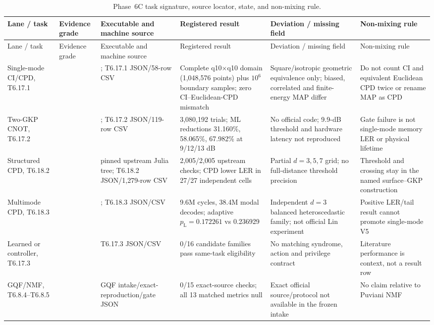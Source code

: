 \documentclass[11pt]{article}
\newcommand{\pL}{p_{\mathrm L}}
\begin{document}
{\scriptsize
\begin{longtable}{@{}L{0.13\textwidth} L{0.15\textwidth} L{0.17\textwidth} L{0.18\textwidth} L{0.16\textwidth} L{0.12\textwidth}@{}}
\caption{Phase~6C task signature, source locator, state, and non-mixing rule.}
\label{tab:supp-phase6c-locator}\\
\toprule
Lane / task & Evidence grade & Executable and machine source & Registered result & Deviation / missing field & Non-mixing rule \\
\midrule
\endfirsthead
\toprule
Lane / task & Evidence grade & Executable and machine source & Registered result & Deviation / missing field & Non-mixing rule \\
\midrule
\endhead
Single-mode CI/CPD, T6.17.1 &  & ; T6.17.1 JSON/58-row CSV & Complete q10$\times$q10 domain (1,048,576 points) plus $10^6$ boundary samples; zero CI--Euclidean-CPD mismatch & Square/isotropic geometric equivalence only; biased, correlated and finite-energy MAP differ & Do not count CI and equivalent Euclidean CPD twice or rename MAP as CPD \\
Two-GKP CNOT, T6.17.2 &  & ; T6.17.2 JSON/119-row CSV & 3,080,192 trials; ML reductions 31.160\%, 58.065\%, 67.982\% at 9/12/13 dB & No official code; 9.9-dB threshold and hardware latency not reproduced & Gate failure is not single-mode memory LER or physical lifetime \\
Structured CPD, T6.18.2 &  & pinned upstream Julia tree; T6.18.2 JSON/1,279-row CSV & 2,005/2,005 upstream checks; CPD lower LER in 27/27 independent cells & Partial $d=3,5,7$ grid; no full-distance threshold precision & Threshold and crossing stay in the named surface--GKP construction \\
Multimode CPD, T6.18.3 &  & ; T6.18.3 JSON/CSV & 9.6M cycles, 38.4M modal decodes; adaptive $\pL=0.172261$ vs 0.236929 & Independent $d=3$ balanced heteroscedastic family; not official Lin experiment & Positive LER/tail result cannot promote single-mode V5 \\
Learned or controller, T6.17.3 &  & T6.17.3 JSON/CSV & 0/16 candidate families pass same-task eligibility & No matching syndrome, action and privilege contract & Literature performance is context, not a result row \\
GQF/NMF, T6.8.4--T6.8.5 &  & GQF intake/exact-reproduction/gate JSON & 0/15 exact-source checks; all 13 matched metrics null & Exact official source/protocol not available in the frozen intake & No claim relative to Puviani NMF \\

\end{longtable}}
\end{document}
